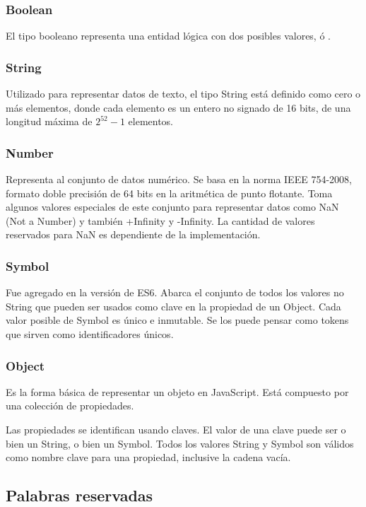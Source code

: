 \subsubsection{Boolean} 
El tipo booleano representa una entidad lógica con dos posibles valores,  ó .

\subsubsection{String} 
Utilizado para representar datos de texto, el tipo String está definido como cero o más elementos, donde cada elemento es un entero no signado de 16 bits, de una longitud máxima de $2^{52}-1$ elementos.

\subsubsection{Number} 
Representa al conjunto de datos numérico. Se basa en la norma IEEE 754-2008, formato doble precisión de 64 bits en la aritmética de punto flotante. Toma algunos valores especiales de este conjunto para representar datos como NaN (Not a Number) y también +Infinity y -Infinity. La cantidad de valores reservados para NaN es dependiente de la implementación.

\subsubsection{Symbol} 
Fue agregado en la versión de ES6. Abarca el conjunto de todos los valores no String que pueden ser usados como clave en la propiedad de un Object. Cada valor posible de Symbol es único e inmutable. Se los puede pensar como tokens que sirven como identificadores únicos. 

\subsubsection{Object} 
Es la forma básica de representar un objeto en JavaScript. Está compuesto por una colección de propiedades.

Las propiedades se identifican usando claves. El valor de una clave puede ser o bien un String, o bien un Symbol. Todos los valores String y Symbol son válidos como nombre clave para una propiedad, inclusive la cadena vacía. 

\subsection{Palabras reservadas}

